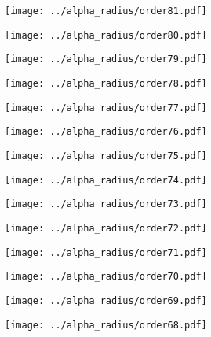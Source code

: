 \documentclass{article}
\begin{document}
\begin{figure}[H]
    \centering
    \texttt{[image: ../alpha\_radius/order81.pdf]}
\end{figure}
\begin{figure}[H]
    \centering
    \texttt{[image: ../alpha\_radius/order80.pdf]}
\end{figure}
\begin{figure}[H]
    \centering
    \texttt{[image: ../alpha\_radius/order79.pdf]}
\end{figure}
\begin{figure}[H]
    \centering
    \texttt{[image: ../alpha\_radius/order78.pdf]}
\end{figure}
\begin{figure}[H]
    \centering
    \texttt{[image: ../alpha\_radius/order77.pdf]}
\end{figure}
\begin{figure}[H]
    \centering
    \texttt{[image: ../alpha\_radius/order76.pdf]}
\end{figure}
\begin{figure}[H]
    \centering
    \texttt{[image: ../alpha\_radius/order75.pdf]}
\end{figure}
\begin{figure}[H]
    \centering
    \texttt{[image: ../alpha\_radius/order74.pdf]}
\end{figure}
\begin{figure}[H]
    \centering
    \texttt{[image: ../alpha\_radius/order73.pdf]}
\end{figure}
\begin{figure}[H]
    \centering
    \texttt{[image: ../alpha\_radius/order72.pdf]}
\end{figure}
\begin{figure}[H]
    \centering
    \texttt{[image: ../alpha\_radius/order71.pdf]}
\end{figure}
\begin{figure}[H]
    \centering
    \texttt{[image: ../alpha\_radius/order70.pdf]}
\end{figure}
\begin{figure}[H]
    \centering
    \texttt{[image: ../alpha\_radius/order69.pdf]}
\end{figure}
\begin{figure}[H]
    \centering
    \texttt{[image: ../alpha\_radius/order68.pdf]}
\end{figure}
\end{document}

